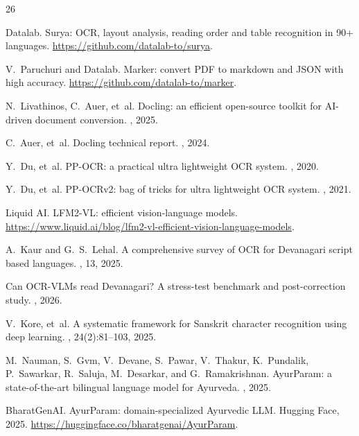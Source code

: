 \documentclass[10pt,twocolumn,letterpaper]{article}
\begin{document}
{\small
\begin{thebibliography}{26}\itemsep2pt

Datalab.
\newblock Surya: OCR, layout analysis, reading order and table recognition in 90+ languages.
\newblock \url{https://github.com/datalab-to/surya}.

V.~Paruchuri and Datalab.
\newblock Marker: convert PDF to markdown and JSON with high accuracy.
\newblock \url{https://github.com/datalab-to/marker}.

N.~Livathinos, C.~Auer, et~al.
\newblock Docling: an efficient open-source toolkit for AI-driven document conversion.
, 2025.

C.~Auer, et~al.
\newblock Docling technical report.
, 2024.

Y.~Du, et~al.
\newblock PP-OCR: a practical ultra lightweight OCR system.
, 2020.

Y.~Du, et~al.
\newblock PP-OCRv2: bag of tricks for ultra lightweight OCR system.
, 2021.

Liquid AI.
\newblock LFM2-VL: efficient vision-language models.
\newblock \url{https://www.liquid.ai/blog/lfm2-vl-efficient-vision-language-models}.

A.~Kaur and G.~S.~Lehal.
\newblock A comprehensive survey of OCR for Devanagari script based languages.
, 13, 2025.

Can OCR-VLMs read Devanagari? A stress-test benchmark and post-correction study.
, 2026.

V.~Kore, et~al.
\newblock A systematic framework for Sanskrit character recognition using deep learning.
, 24(2):81--103, 2025.

M.~Nauman, S.~Gvm, V.~Devane, S.~Pawar, V.~Thakur, K.~Pundalik, P.~Sawarkar, R.~Saluja, M.~Desarkar, and G.~Ramakrishnan.
\newblock AyurParam: a state-of-the-art bilingual language model for Ayurveda.
, 2025.

BharatGenAI.
\newblock AyurParam: domain-specialized Ayurvedic LLM.
\newblock Hugging Face, 2025.
\newblock \url{https://huggingface.co/bharatgenai/AyurParam}.


\end{thebibliography}}
\end{document}
